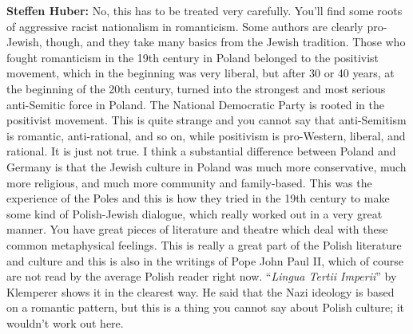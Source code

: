 \textbf{Steffen Huber:} No, this has to be treated very carefully. You’ll find some roots of aggressive racist nationalism in romanticism. Some authors are clearly pro-Jewish, though, and they take many basics from the Jewish tradition. Those who fought romanticism in the 19th century in Poland belonged to the positivist movement, which in the beginning was very liberal, but after 30 or 40 years, at the beginning of the 20th century, turned into the strongest and most serious anti-Semitic force in Poland. The National Democratic Party is rooted in the positivist movement. This is quite strange and you cannot say that anti-Semitism is romantic, anti-rational, and so on, while positivism is pro-Western, liberal, and rational. It is just not true. I think a substantial difference between Poland and Germany is that the Jewish culture in Poland was much more conservative, much more religious, and much more community and family-based. This was the experience of the Poles and this is how they tried in the 19th century to make some kind of Polish-Jewish dialogue, which really worked out in a very great manner. You have great pieces of literature and theatre which deal with these common metaphysical feelings. This is really a great part of the Polish literature and culture and this is also in the writings of Pope John Paul II, which of course are not read by the average Polish reader right now. ``\textit{Lingua Tertii Imperii}'' by Klemperer shows it in the clearest way. He said that the Nazi ideology is based on a romantic pattern, but this is a thing you cannot say about Polish culture; it wouldn't work out here.